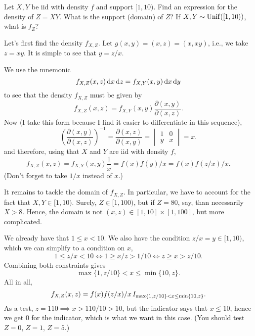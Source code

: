 \documentclass[lectures-questions]{subfiles}
\begin{document}
\begin{exercise}
Let $X,Y$ be iid with density $f$ and support $[1,10)$. Find an expression for the density of $Z=X Y$. What is the support (domain) of $Z$? If $X,Y\sim\mathrm{Unif}([1,10))$, what is $f_{Z}$?
\begin{solution}
Let's first find the density $f_{X,Z}$.
Let $g(x,y) = (x, z) = (x, x y)$, i.e., we take $z=x y$. It is simple to see that $y=z/x$.

We use the mnemonic
\begin{equation}
\label{eq:0520}
f_{X,Z}(x,z) \,\textrm{d}x \,\textrm{d}z =
f_{X,Y}(x,y) \,\textrm{d}x \,\textrm{d}y
\end{equation}
to see that the density $f_{X,Z}$ must be given by
\begin{equation}
f_{X,Z}(x,z)  = f_{X,Y}(x,y) \frac{\partial(x,y)}{\partial(x, z)}.
\end{equation}
Now (I take this form because I find it easier to differentiate in this sequence),
\begin{equation}
\label{eq:0519}
\left(\frac{\partial(x,y)}{\partial(x,z)}\right)^{-1} =
\frac{\partial(x,z)}{\partial(x,y)} =
\begin{vmatrix}
  1 & 0 \\
y & x
\end{vmatrix} = x.
\end{equation}
and therefore, using that $X$ and $Y$ are iid with density $f$,
\begin{equation}
f_{X,Z}(x,z)  = f_{X,Y}(x,y) \frac{1}{x} = f(x)f(y)/x = f(x)f(z/x)/ x.
\end{equation}
(Don't forget to take $1/x$ instead of $x$.)

It remains to tackle the domain of $f_{X,Z}$.
In particular, we have to account for the fact that $X, Y\in [1,10)$.
Surely, $Z\in [1, 100)$, but if $Z=80$, say, than necessarily $X>8$.
Hence, the domain is not $(x,z) \in [1,10]\times [1, 100]$, but more complicated.

We already have that $1\leq x < 10$. We also have the condition $z/x = y\in [1, 10)$, which we can simplify to a condition on $x$,
\begin{equation}
\label{eq:0522}
1\leq z/x < 10 \iff 1 \geq x/z > 1/10 \iff z \geq x > z/10.
\end{equation}
Combining both constraints gives
\begin{equation}
\max\{1, z/10\} < x \leq \min\{10, z\}.
\end{equation}
All in all,
\begin{equation}
f_{X,Z}(x,z)  = f(x)f(z/x)/ x \,I_{\max\{1, z/10\}< x \leq \min\{10, z\}}.
\end{equation}
As a test, $z=110 \implies x > 110/10 > 10$, but the indicator says that $x\leq 10$, hence we get 0 for the indicator, which is what we want in this case. (You should test $Z=0$, $Z=1$, $Z=5$.)


\end{solution}
\end{exercise}
\end{document}
